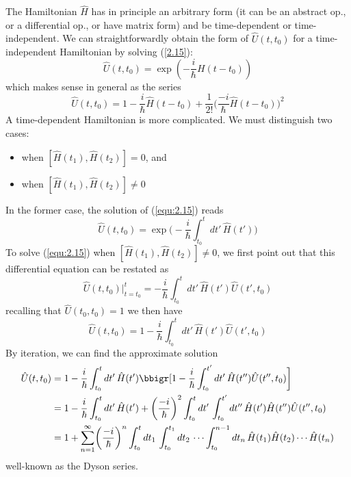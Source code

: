 The Hamiltonian $\hat{H}$ has in principle an arbitrary form
(it can be an abstract op., or a differential op., or have
matrix form) and be time-dependent or time-independent. We
can straightforwardly obtain the form of $\hat{U}(t,t_0)$
for a time-independent Hamiltonian by solving (\ref{2.15}):
\begin{equation}
  \hat{U}(t,t_0) = \exp(-\frac{i}{\hbar}H(t-t_0))
  \label{equ:2.17}
\end{equation}
which makes sense in general as the series
\begin{equation}
  \hat{U}(t,t_0) = 1 -
  \frac{i}{\hbar}\hat{H}(t-t_0)+\frac{1}{2!}\Big(\frac{-i}{\hbar}\hat{H}(t-t_0)\Big)^2
  \label{equ:2.18}
\end{equation}
A time-dependent Hamiltonian is more complicated. We must
distinguish two cases:
\begin{itemize}
  \item when $[\hat{H}(t_1), \hat{H}(t_2)] = 0$, and
  \item when $[\hat{H}(t_1), \hat{H}(t_2)] \neq 0$
\end{itemize}
In the former case, the solution of (\ref{equ:2.15}) reads
\begin{equation}
  \hat{U}(t,t_0) = \exp\Big(-\frac{i}{\hbar}\int_{t_0}^t dt'
  \, \hat{H}(t')\Big)
  \label{equ:2.19}
\end{equation}
To solve (\ref{equ:2.15}) when $[\hat{H}(t_1), \hat{H}(t_2)]
\neq 0$, we first point out that this differential equation
can be restated as
$$
\hat{U}(t,t_0) \bigg|_{t=t_0}^t = 
-\frac{i}{\hbar} \int_{t_0}^t dt' \,
\hat{H}(t')\hat{U}(t',t_0)
$$
recalling that $\hat{U}(t_0,t_0) = 1$ we then have
\begin{equation}
  \hat{U}(t,t_0) = 1 - \frac{i}{\hbar} \int_{t_0}^t dt' \,
  \hat{H}(t')\hat{U}(t',t_0)
  \label{equ:2.20}
\end{equation}
By iteration, we can find the approximate solution
\begin{align}
  \hat{U}(t,t_0) &= 1 - \frac{i}{\hbar} \int_{t_0}^t dt'\,
  \hat{H}(t')\bbigr[1 - \frac{i}{\hbar}
  \int_{t_0}^{t'} dt'\, \hat{H}(t'')\hat{U}(t'',t_0)\biggl]
  \\
  &=
  1 - \frac{i}{\hbar} \int_{t_0}^t dt' \, \hat{H}(t') + 
  \biggl(\frac{-i}{\hbar}\biggr)^2 \int_{t_0}^t dt' \,
  \int_{t_0}^{t'} dt'' \, \hat{H}(t') \hat{H}(t'')
  \hat{U}(t'',t_0)\\
  &=
  1 + \sum_{n=1}^{\infty} 
  \biggl(\frac{-i}{\hbar}\biggr)^n
  \int_{t_0}^t dt_1\,
  \int_{t_0}^{t_1} dt_2\,
  \cdots
  \int_{t_0}^{n-1} dt_n\,
  \hat{H}(t_1) \hat{H}(t_2) \cdots \hat{H}(t_n)
\end{align}
well-known as the Dyson series.

